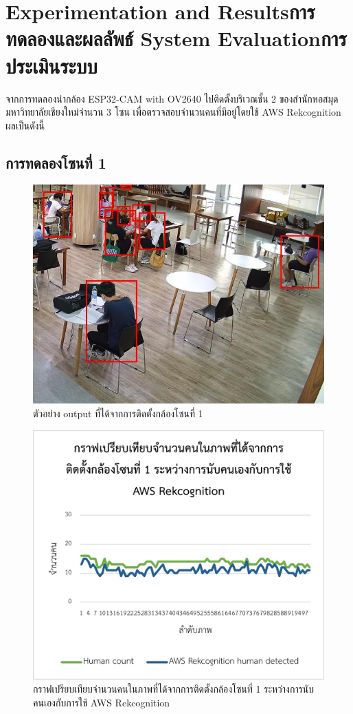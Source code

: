 \chapter{\ifproject%
\ifenglish Experimentation and Results\else การทดลองและผลลัพธ์\fi
\else%
\ifenglish System Evaluation\else การประเมินระบบ\fi
\fi}
\hspace{10mm} จากการทดลองนำกล้อง ESP32-CAM with OV2640 ไปติดตั้งบริเวณชั้น 2 ของสำนักหอสมุดมหาวิทยาลัยเชียงใหม่จำนวน 3 โซน เพื่อตรวจสอบจำนวนคนที่มีอยู่โดยใช้ AWS Rekcognition ผลเป็นดังนี้

\section{การทดลองโซนที่ 1}
\begin{figure}[ht]
    \centering
    \includegraphics[scale=0.5]{images/modified_Picture (100).jpg}
    \caption[output1]{ตัวอย่าง output ที่ได้จากการติดตั้งกล้องโซนที่ 1}
    \label{fig:output1}
\end{figure}
\begin{figure}[ht]
    \centering
    \includegraphics[scale=1]{images/graph1_zone1.png}
    \caption[graph1-1]{กราฟเปรียบเทียบจำนวนคนในภาพที่ได้จากการติดตั้งกล้องโซนที่ 1 ระหว่างการนับคนเองกับการใช้ AWS Rekcognition}
    \label{fig:graph1-1}
\end{figure}
